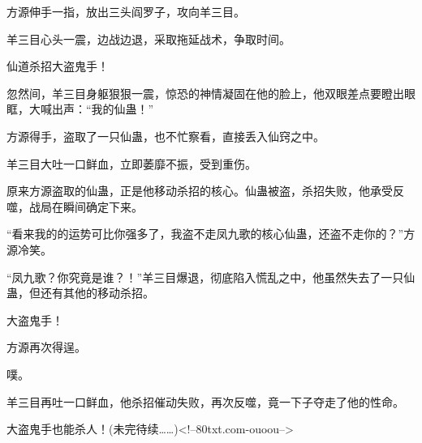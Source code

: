 \begin{this_body}
方源伸手一指，放出三头阎罗子，攻向羊三目。

羊三目心头一震，边战边退，采取拖延战术，争取时间。

仙道杀招大盗鬼手！

忽然间，羊三目身躯狠狠一震，惊恐的神情凝固在他的脸上，他双眼差点要瞪出眼眶，大喊出声：“我的仙蛊！”

方源得手，盗取了一只仙蛊，也不忙察看，直接丢入仙窍之中。

羊三目大吐一口鲜血，立即萎靡不振，受到重伤。

原来方源盗取的仙蛊，正是他移动杀招的核心。仙蛊被盗，杀招失败，他承受反噬，战局在瞬间确定下来。

“看来我的的运势可比你强多了，我盗不走凤九歌的核心仙蛊，还盗不走你的？”方源冷笑。

“凤九歌？你究竟是谁？！”羊三目爆退，彻底陷入慌乱之中，他虽然失去了一只仙蛊，但还有其他的移动杀招。

大盗鬼手！

方源再次得逞。

噗。

羊三目再吐一口鲜血，他杀招催动失败，再次反噬，竟一下子夺走了他的性命。

大盗鬼手也能杀人！(未完待续……)<!--80txt.com-ouoou-->

\end{this_body}

